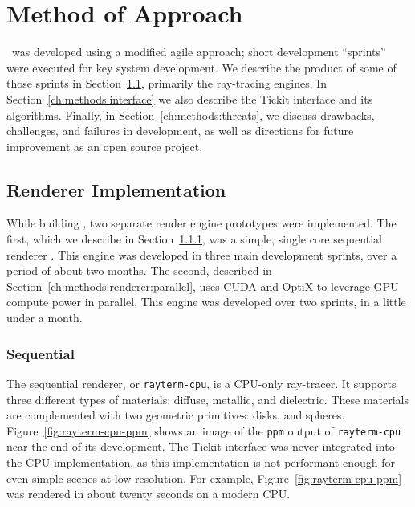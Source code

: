 %
%
%
\chapter{Method of Approach} \label{ch:methods}

\name\ was developed using a modified agile approach; short development ``sprints'' were executed for key system development.
We describe the product of some of those sprints in Section~\ref{ch:methods:renderer}, primarily the ray-tracing engines.
In Section~\ref{ch:methods:interface} we also describe the Tickit interface and its algorithms.
Finally, in Section~\ref{ch:methods:threats}, we discuss drawbacks, challenges, and failures in development, as well as directions for future improvement as an open source project.


\section{Renderer Implementation} \label{ch:methods:renderer}
While building \name, two separate render engine prototypes were implemented.
The first, which we describe in Section~\ref{ch:methods:renderer:sequential}, was a simple, single core sequential renderer \cite{raytermCpuImpl}.
This engine was developed in three main development sprints, over a period of about two months.
The second, described in Section~\ref{ch:methods:renderer:parallel}, uses CUDA \cite{nvidia2011cuda} and OptiX \cite{parker2010optix} to leverage GPU compute power in parallel.
This engine was developed over two sprints, in a little under a month.


\subsection{Sequential} \label{ch:methods:renderer:sequential}

The sequential renderer, or \texttt{rayterm-cpu}, is a CPU-only ray-tracer.
It supports three different types of materials: diffuse, metallic, and dielectric.
These materials are complemented with two geometric primitives: disks, and spheres.
Figure~\ref{fig:rayterm-cpu-ppm} shows an image of the \texttt{ppm} output of \texttt{rayterm-cpu} near the end of its development.
The Tickit interface was never integrated into the CPU implementation, as this implementation is not performant enough for even simple scenes at low resolution.
For example, Figure~\ref{fig:rayterm-cpu-ppm} was rendered in about twenty seconds on a modern CPU.

